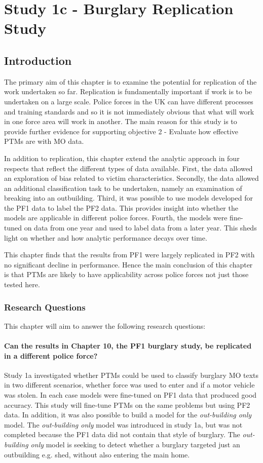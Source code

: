 \chapter{Study 1c - Burglary Replication Study}

\section{Introduction} The primary aim of this chapter is to examine the potential for replication of the work undertaken so far. Replication is fundamentally important if work is to be undertaken on a large scale. Police forces in the UK can have different processes and training standards and so it is not immediately obvious that what will work in one force area will work in another. The main reason for this study is to provide further evidence for supporting objective 2 - Evaluate how effective PTMs are with MO data.
 
In addition to replication, this chapter  extend the analytic approach in four respects that reflect the different types of data available. First, the data allowed an exploration of bias related to victim characteristics. Secondly, the data allowed an additional classification task to be undertaken, namely an examination of breaking into an outbuilding. Third, it was possible to use models developed for the PF1 data to label the PF2 data. This provides insight into whether the models are applicable in different police forces.  Fourth,  the models were fine-tuned on data from one year and used to label data from a later year. This sheds light on  whether and how analytic performance decays over time.

This chapter finds that the results from PF1  were largely replicated in PF2 with no significant decline in performance.  Hence the main conclusion of this chapter is that PTMs are likely to have applicability across police forces not just those tested here.  



\subsection{Research Questions} This chapter will aim to answer the following research questions:


\subsubsection{Can the results in Chapter 10, the PF1 burglary study, be replicated in a different police force?} Study 1a investigated whether PTMs could be used to classify burglary MO texts in two different scenarios, whether force was used to enter and if a motor vehicle was stolen. In each case models were fine-tuned on PF1 data that produced good accuracy. This study will fine-tune PTMs on the same problems but using PF2 data.  In addition, it was also possible to build a model for the \emph{out-building only} model. The \emph{out-building only} model was introduced in study 1a, but was not completed because the PF1 data did not contain that style of burglary. The \emph{out-building only} model is seeking to detect whether a burglary targeted just an outbuilding e.g. shed, without also entering the main home.

